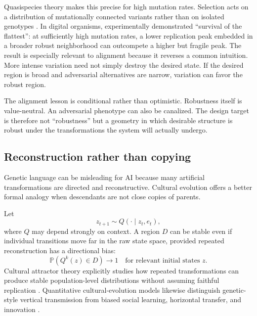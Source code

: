 \documentclass[11pt]{article}
\newcommand{\Prb}{\mathbb{P}}
\begin{document}
Quasispecies theory makes this precise for high mutation rates. Selection acts on a distribution of mutationally connected variants rather than on isolated genotypes \parencite{eigen1971,hermisson2002}. In digital organisms, \textcite{wilke2001} experimentally demonstrated ``survival of the flattest'': at sufficiently high mutation rates, a lower replication peak embedded in a broader robust neighborhood can outcompete a higher but fragile peak. The result is especially relevant to alignment because it reverses a common intuition. More intense variation need not simply destroy the desired state. If the desired region is broad and adversarial alternatives are narrow, variation can favor the robust region.

The alignment lesson is conditional rather than optimistic. Robustness itself is value-neutral. An adversarial phenotype can also be canalized. The design target is therefore not ``robustness'' but a geometry in which desirable structure is robust under the transformations the system will actually undergo.

\subsection{Reconstruction rather than copying}

Genetic language can be misleading for AI because many artificial transformations are directed and reconstructive. Cultural evolution offers a better formal analogy when descendants are not close copies of parents.

Let
\begin{equation}
    z_{t+1}\sim Q(\cdot\mid z_t,e_t),
\end{equation}
where $Q$ may depend strongly on context. A region $D$ can be stable even if individual transitions move far in the raw state space, provided repeated reconstruction has a directional bias:
\begin{equation}
    \Prb\!\left(Q^k(z)\in D\right)\rightarrow 1
    \quad\text{for relevant initial states }z.
    \label{eq:reconstructive-attractor}
\end{equation}
Cultural attractor theory explicitly studies how repeated transformations can produce stable population-level distributions without assuming faithful replication \parencite{buskell2017}. Quantitative cultural-evolution models likewise distinguish genetic-style vertical transmission from biased social learning, horizontal transfer, and innovation \parencite{creanza2017}.
\end{document}
